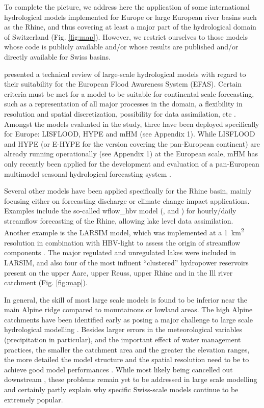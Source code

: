 \documentclass[10pt,a4paper]{article}
\begin{document}
To complete the picture, we address here the application of some international hydrological models implemented for Europe or large European river basins such as the Rhine, and thus covering at least a major part of the hydrological domain of Switzerland (Fig. \ref{fig:map}). However, we restrict ourselves to those models whose code is publicly available and/or whose results are published and/or directly available for Swiss basins.

\citet{Kauffeldt2016} presented a technical review of large-scale hydrological models with regard to their suitability for the European Flood Awareness System (EFAS). Certain criteria must be met for a model to be suitable for continental scale forecasting, such as a representation of all major processes in the domain, a flexibility in resolution and spatial discretization, possibility for data assimilation, etc \citep{Kauffeldt2016}. Amongst the models evaluated in the study, three have been deployed specifically for Europe: LISFLOOD, HYPE and mHM (see Appendix 1). While LISFLOOD and HYPE (or E-HYPE for the version covering the pan-European continent) are already running operationally (see Appendix 1) at the European scale, mHM has only recently been applied for the development and evaluation of a pan-European multimodel seasonal hydrological forecasting system \citep{Wanders2019}.

Several other models have been applied specifically for the Rhine basin, mainly focusing either on forecasting discharge or climate change impact applications. Examples include the so-called wflow\_hbv model (\citealp{vanOsnabrugge2017}, \citealp{vanOsnabrugge2019} and \citealt{vanOsnabrugge}) for hourly/daily streamflow forecasting of the Rhine, allowing lake level data assimilation. Another example is the LARSIM model, which was implemented at a 1~km\textsuperscript{2} resolution in combination with HBV-light to assess the origin of streamflow components \citep{m2017}. The major regulated and unregulated lakes were included in LARSIM, and also four of the most influent ``clustered'' hydropower reservoirs present on the upper Aare, upper Reuss, upper Rhine and in the Ill river catchment (Fig. \ref{fig:map}).

In general, the skill of most large scale models is found to be inferior near the main Alpine ridge compared to mountainous or lowland areas. The high Alpine catchments have been identified early as posing a major challenge to large scale hydrological modelling \citep{Kleinn2005}.  Besides larger errors in the meteorological variables (precipitation in particular), and the important effect of water management practices, the smaller the catchment area and the greater the elevation ranges, the more detailed the model structure and the spatial resolution need to be to achieve good model performances \citep{Gurtz2003}. While most likely being cancelled out downstream \citep{Kleinn2005}, these problems remain yet to be addressed in large scale modelling and certainly partly explain why specific Swiss-scale models continue to be extremely popular. 
\end{document}
